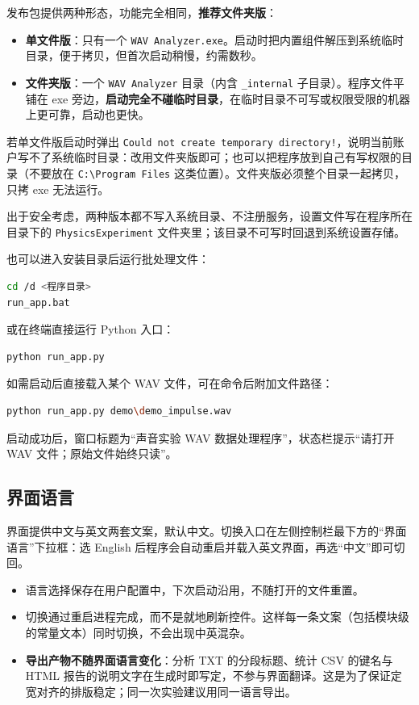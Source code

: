 \documentclass[UTF8,a4paper,12pt,scheme=chinese]{ctexart}
\begin{document}
发布包提供两种形态，功能完全相同，\textbf{推荐文件夹版}：

\begin{itemize}
  \item \textbf{单文件版}：只有一个 \texttt{WAV Analyzer.exe}。启动时把内置组件解压到系统临时目录，便于拷贝，但首次启动稍慢，约需数秒。
  \item \textbf{文件夹版}：一个 \texttt{WAV Analyzer} 目录（内含 \texttt{\_internal} 子目录）。程序文件平铺在 exe 旁边，\textbf{启动完全不碰临时目录}，在临时目录不可写或权限受限的机器上更可靠，启动也更快。
\end{itemize}

若单文件版启动时弹出 \texttt{Could not create temporary directory!}，说明当前账户写不了系统临时目录：改用文件夹版即可；也可以把程序放到自己有写权限的目录（不要放在 \texttt{C:\textbackslash Program Files} 这类位置）。文件夹版必须整个目录一起拷贝，只拷 exe 无法运行。

出于安全考虑，两种版本都不写入系统目录、不注册服务，设置文件写在程序所在目录下的 \texttt{PhysicsExperiment} 文件夹里；该目录不可写时回退到系统设置存储。

也可以进入安装目录后运行批处理文件：

\begin{lstlisting}[language=bash]
cd /d <程序目录>
run_app.bat
\end{lstlisting}

或在终端直接运行 Python 入口：

\begin{lstlisting}[language=bash]
python run_app.py
\end{lstlisting}

如需启动后直接载入某个 WAV 文件，可在命令后附加文件路径：

\begin{lstlisting}[language=bash]
python run_app.py demo\demo_impulse.wav
\end{lstlisting}

启动成功后，窗口标题为“声音实验 WAV 数据处理程序”，状态栏提示“请打开 WAV 文件；原始文件始终只读”。

\subsection{界面语言}

界面提供中文与英文两套文案，默认中文。切换入口在左侧控制栏最下方的“界面语言”下拉框：选 English 后程序会自动重启并载入英文界面，再选“中文”即可切回。

\begin{itemize}
  \item 语言选择保存在用户配置中，下次启动沿用，不随打开的文件重置。
  \item 切换通过重启进程完成，而不是就地刷新控件。这样每一条文案（包括模块级的常量文本）同时切换，不会出现中英混杂。
  \item \textbf{导出产物不随界面语言变化}：分析 TXT 的分段标题、统计 CSV 的键名与 HTML 报告的说明文字在生成时即写定，不参与界面翻译。这是为了保证定宽对齐的排版稳定；同一次实验建议用同一语言导出。
\end{itemize}
\end{document}
